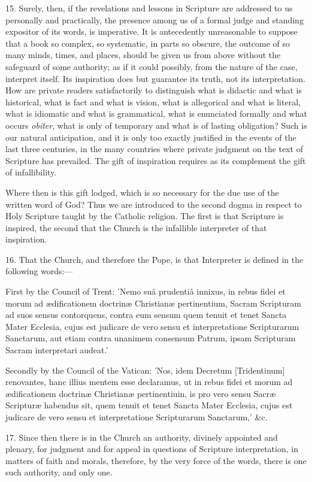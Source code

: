 15. Surely, then, if the revelations and lessons
in Scripture are addressed to us personally and practically, the
presence among us of a formal judge and standing expositor of its
words, is imperative. It is antecedently unreasonable to suppose that
a book so complex, so systematic, in parts so obscure, the outcome of
so many minds, times, and places, should be given us from above
without the safeguard of some authority; as if it could possibly, from
the nature of the case, interpret itself. Its inspiration does but
guarantee its truth, not its interpretation. How are private readers
satisfactorily to distinguish what is didactic and what is historical,
what is fact and what is vision, what is allegorical and what is
literal, what is idiomatic and what is grammatical, what is enunciated
formally and what occurs \emph{obiter}, what is only of temporary and
what is of lasting obligation? Such is our natural anticipation, and
it is only too exactly justified in the events of the last three
centuries, in the many countries where private judgment on the text of
Scripture has prevailed. The gift of inspiration requires as its
complement the gift of infallibility.

Where then is this gift lodged, which is so
necessary for the due use of the written word of God? Thus we are
introduced to the second dogma in respect to Holy Scripture taught by
the Catholic religion. The first is that Scripture is inspired, the
second that the Church is the infallible interpreter of that
inspiration.

16. That the Church, and therefore the Pope, is
that Interpreter is defined in the following words:—

First by the Council of Trent: 'Nemo suâ
prudentiâ innixus, in rebus fidei et morum ad ædificationem doctrinæ
Christianæ pertinentium, Sacram Scripturam ad suos sensus contorquens,
contra eum sensum quem tenuit et tenet Sancta Mater Ecclesia, cujus
est judicare de vero sensu et interpretatione Scripturarum Sanctarum,
aut etiam contra unanimem consensum Patrum, ipsam Scripturam Sacram
interpretari audeat.'

Secondly by the Council of the Vatican: 'Nos,
idem Decretum [Tridentinum] renovantes, hanc illius mentem esse
declaramus, ut in rebus fidei et morum ad ædificationem doctrinæ
Christianæ pertinentiuin, is pro vero sensu Sacræ Scripturæ
habendus sit, quem tenuit et tenet Sancta Mater Ecclesia, cujus est
judicare de vero sensu et interpretatione Scripturarum Sanctarum,'
\&c.

17. Since then there is in the Church an
authority, divinely appointed and plenary, for judgment and for appeal
in questions of Scripture interpretation, in matters of faith and
morals, therefore, by the very force of the words, there is one such
authority, and only one.

